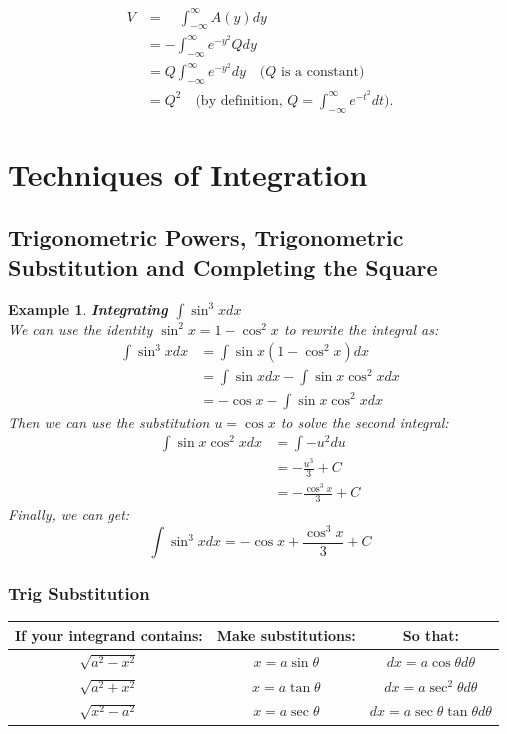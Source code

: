 \documentclass[10pt, a4paper]{article}
\newtheorem{example}{Example}
\begin{document}
\begin{align*}
    V & =\quad\int_{-\infty}^{\infty}A(y)dy  \\
    &=-\int_{-\infty}^{\infty}e^{-y^2}Qdy \\
    &= Q\int_{-\infty}^{\infty}e^{-y^2}dy \quad\text{($Q$ is a constant)} \\
    &= Q^2 \quad\text{(by definition, } Q=\int_{-\infty}^\infty e^{-t^2}dt).
\end{align*}

\section{Techniques of Integration}
\subsection{Trigonometric Powers, Trigonometric Substitution and Completing the Square}
\begin{example}
    \textbf{Integrating $\int \sin ^3 x dx$} \\
    We can use the identity $\sin ^2 x = 1 - \cos ^2 x$ to rewrite the integral as:
    \begin{align*}
        \int \sin ^3 x dx &= \int \sin x (1 - \cos ^2 x)dx \\
        &= \int \sin x dx - \int \sin x \cos ^2 x dx \\
        &= -\cos x - \int \sin x \cos ^2 x dx
    \end{align*}
    Then we can use the substitution $u = \cos x$ to solve the second integral:
    \begin{align*}
        \int \sin x \cos ^2 x dx &= \int -u^2 du \\
        &= -\frac{u^3}{3} + C \\
        &= -\frac{\cos ^3 x}{3} + C
    \end{align*}
    Finally, we can get:
    \[\int \sin ^3 x dx = -\cos x + \frac{\cos ^3 x}{3} + C\]
\end{example}

\subsubsection*{Trig Substitution}
\begin{center}
    \begin{tabular}{|c|c|c|}
        \hline
        If your integrand contains: & Make substitutions: & So that: \\
        \hline
        $\sqrt{a^2-x^2}$ & $x = a\sin\theta$ & $dx = a\cos\theta d\theta$ \\
    
        $\sqrt{a^2+x^2}$ & $x = a\tan\theta$ & $dx = a\sec^2\theta d\theta$ \\
    
        $\sqrt{x^2-a^2}$ & $x = a\sec\theta$ & $dx = a\sec\theta\tan\theta d\theta$ \\
        \hline
    \end{tabular}
\end{center}
\end{document}
